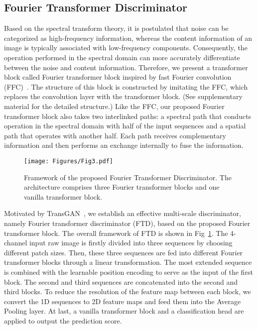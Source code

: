 \documentclass[10pt,twocolumn,letterpaper]{article}
\begin{document}
\subsection{Fourier Transformer Discriminator}
\label{ftd}
Based on the spectral transform theory, it is postulated that noise can be categorized as high-frequency information, whereas the content information of an image is typically associated with low-frequency components. Consequently, the operation performed in the spectral domain can more accurately differentiate between the noise and content information. Therefore, we present a transformer block called Fourier transformer block inspired by fast Fourier convolution (FFC)~\cite{chi2020fast}. The structure of this block is constructed by imitating the FFC, which replaces the convolution layer with the transformer block. (See supplementary material for the detailed structure.) Like the FFC, our proposed Fourier transformer block also takes two interlinked paths: a spectral path that conducts operation in the spectral domain with half of the input sequences and a spatial path that operates with another half. Each path receives complementary information and then performs an exchange internally to fuse the information. 

\begin{figure}[t]
\centering
\texttt{[image: Figures/Fig3.pdf]}
\caption{Framework of the proposed Fourier Transformer Discriminator. The architecture comprises three Fourier transformer blocks and one vanilla transformer block.}
\label{fig:ffcd}
\vspace{-1ex}
\end{figure}

Motivated by TransGAN~\cite{jiang2021transgan}, we establish an effective multi-scale discriminator, namely Fourier transformer discriminator (FTD), based on the proposed Fourier transformer block. The overall framework of FTD is shown in Fig~\ref{fig:ffcd}. The 4-channel input raw image is firstly divided into three sequences by choosing different patch sizes. Then, these three sequences are fed into different Fourier transformer blocks through a linear transformation. The most extended sequence is combined with the learnable position encoding to serve as the input of the first block. The second and third sequences are concatenated into the second and third blocks. To reduce the resolution of the feature map between each block, we convert the 1D sequences to 2D feature maps and feed them into the Average Pooling layer. At last, a vanilla transformer block and a classification head are applied to output the prediction score.
\end{document}
